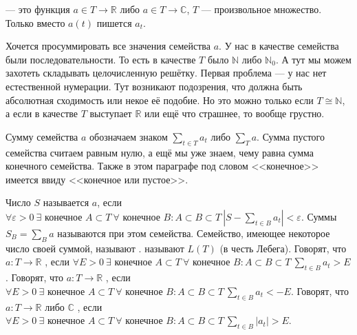 \documentclass{article}
\begin{document}
    \begin{itemize}
        \dfn {} --- это функция $a\in T\to\mathbb R$ либо $a\in T\to\mathbb C$, $T$ --- произвольное множество. Только вместо $a(t)$ пишется $a_t$.
        \begin{Comment}
            Хочется просуммировать все значения семейства $a$. У нас в качестве семейства были последовательности. То есть в качестве $T$ было $\mathbb N$ либо $\mathbb N_0$. А тут мы можем захотеть складывать целочисленную решётку. Первая проблема --- у нас нет естественной нумерации. Тут возникают подозрения, что должна быть абсолютная сходимость или некое её подобие. Но это можно только если $T\cong\mathbb N$, а если в качестве $T$ выступает $\mathbb R$ или ещё что страшнее, то вообще грустно.
        \end{Comment}
        \begin{Comment}
            Сумму семейства $a$ обозначаем знаком $\sum\limits_{t\in T}a_t$ либо $\sum\limits_T a$. Сумма пустого семейства считаем равным нулю, а ещё мы уже знаем, чему равна сумма конечного семейства. Также в этом параграфе под словом <<конечное>> имеется ввиду <<конечное или пустое>>.
        \end{Comment}
        \dfn Число $S$ называется  $a$, если $\forall\varepsilon>0~\exists\text{ конечное }A\subset T~\forall\text{ конечное }B:A\subset B\subset T~\left|S-\sum\limits_{t\in B}a_t\right|<\varepsilon$. Суммы $S_B=\sum\limits_Ba$ называются при этом  семейства. Семейство, имеющее некоторое число своей суммой, называют .  называют $L(T)$ (в честь Лебега).
        \dfn Говорят, что  $a\colon T\to\mathbb R$ , если $\forall E>0~\exists\text{ конечное }A\subset T~\forall\text{ конечное }B:A\subset B\subset T~\sum\limits_{t\in B}a_t>E$.
        \dfn Говорят, что  $a\colon T\to\mathbb R$ , если $\forall E>0~\exists\text{ конечное }A\subset T~\forall\text{ конечное }B:A\subset B\subset T~\sum\limits_{t\in B}a_t<-E$.
        \dfn Говорят, что  $a\colon T\to\mathbb R$ либо $\mathbb C$ , если $\forall E>0~\exists\text{ конечное }A\subset T~\forall\text{ конечное }B:A\subset B\subset T~\sum\limits_{t\in B}|a_t|>E$.
        \begin{Comment}

\end{Comment}
\end{itemize}
\end{document}
